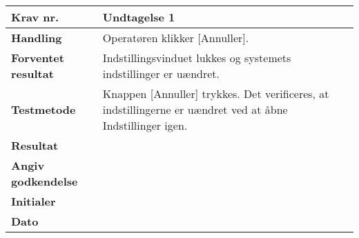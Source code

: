 	\begin{center}
		\begin{longtable}{ | m{4cm}| m{8.5cm}|} 
			\hline
			\textbf{Krav nr.} & Undtagelse 1 \\ 
			\hline
			\textbf{Handling} & Operatøren klikker [Annuller].  \\
			\hline
			\textbf{Forventet resultat} & Indstillingsvinduet lukkes og systemets indstillinger er uændret.  \\
			\hline
			\textbf{Testmetode}  & Knappen [Annuller] trykkes. Det verificeres, at indstillingerne er uændret ved at åbne Indstillinger igen.  \\
			\hline
			\textbf{Resultat}  &    \\
			\hline
			\textbf{Angiv godkendelse} &     \\
			\hline
			\textbf{Initialer} &     \\
			\hline
			\textbf{Dato} &    \\
			\hline
		\end{longtable}
	\end{center}